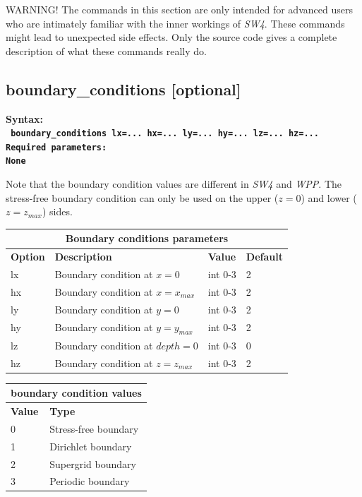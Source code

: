 \documentclass[11pt]{report}
\begin{document}
WARNING! The commands in this section are only intended for advanced users who are intimately
familiar with the inner workings of \emph{SW4}. These commands might lead to unexpected side
effects. Only the source code gives a complete description of what these commands really do.
\subsection{boundary\_conditions [optional]}
\label{keyword:boundary_conditions}
\begin{flushleft}\bf
Syntax:\\
\tt
boundary\_conditions lx=... hx=... ly=... hy=... lz=... hz=...
\\
\bf Required parameters:\\
\rm
None
\end{flushleft}
Note that the boundary condition values are different in \emph{SW4} and \emph{WPP}.
The stress-free boundary condition can only be used on the upper ($z=0$) and 
lower ($z=z_{max}$) sides. 
\begin{center}
\begin{tabular}{|l|p{10cm}|l|l|} \hline
\multicolumn{4}{|c|}{\bf Boundary conditions parameters}\\ \hline
\bf{Option} & \bf{Description} & \bf{Value} & \bf{Default} \\ \hline \hline
lx & Boundary condition at $x=0$      & int 0-3 & 2 \\ \hline
hx & Boundary condition at $x=x_{max}$ & int 0-3 & 2 \\ \hline 
ly & Boundary condition at $y=0$      & int 0-3 & 2 \\ \hline
hy & Boundary condition at $y=y_{max}$ & int 0-3 & 2 \\ \hline 
lz & Boundary condition at $depth=0 $ & int 0-3 & 0 \\ \hline 
hz & Boundary condition at $z=z_{max}$ & int 0-3 & 2 \\ \hline
\end{tabular}
\end{center}

\begin{center}
\begin{tabular}{|l|p{10cm}|} \hline
\multicolumn{2}{|c|}{\bf boundary condition values }\\ \hline
\bf{Value} & \bf{Type} \\ \hline \hline
0 & Stress-free boundary   \\ \hline
1 & Dirichlet boundary  \\ \hline
2 & Supergrid boundary         \\ \hline
3 & Periodic boundary         \\ \hline
\end{tabular}
\end{center}
\end{document}
